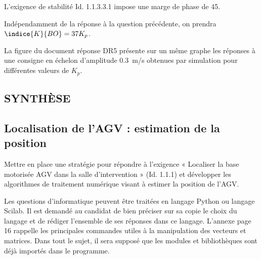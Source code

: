 L’exigence de stabilité Id. 1.1.3.3.1 impose une marge de phase de 45\degres.

Indépendamment de la réponse à la question précédente, on prendra $\indice{K}{BO} = 37K_p$.


La figure du document réponse DR5 présente sur un même graphe les réponses à une consigne en
échelon d’amplitude \SI{0,3}{m/s} obtenues par simulation pour différentes valeurs de $K_p$.


\subsection*{SYNTHÈSE}



\subsection*{ Localisation de l’AGV : estimation de la position}
\begin{obj}
Mettre en place une stratégie pour répondre à l’exigence « Localiser la base motorisée AGV
dans la salle d’intervention » (Id. 1.1.1) et développer les algorithmes de traitement numérique
visant à estimer la position de l’AGV.
\end{obj}


Les questions d’informatique peuvent être traitées en langage Python ou langage Scilab. Il est
demandé au candidat de bien préciser sur sa copie le choix du langage et de rédiger l’ensemble
de ses réponses dans ce langage. L’annexe page 16 rappelle les principales commandes utiles à
la manipulation des vecteurs et matrices.
Dans tout le sujet, il sera supposé que les modules et bibliothèques sont déjà importés dans le
programme.

